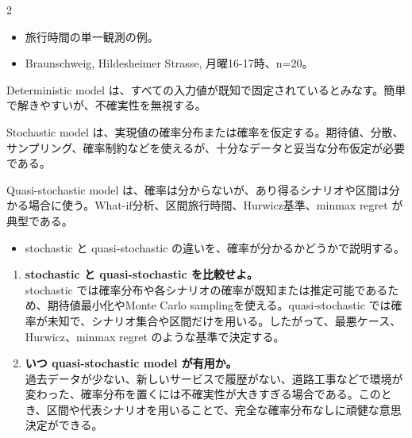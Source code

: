 \clearpage
{}
\begin{multicols}{2}\footnotesize\raggedcolumns
{}
\begin{itemize}
\item 旅行時間の単一観測の例。
\item Braunschweig, Hildesheimer Strasse, 月曜16-17時、n=20。
\end{itemize}
Deterministic model は、すべての入力値が既知で固定されているとみなす。簡単で解きやすいが、不確実性を無視する。\par

Stochastic model は、実現値の確率分布または確率を仮定する。期待値、分散、サンプリング、確率制約などを使えるが、十分なデータと妥当な分布仮定が必要である。\par

Quasi-stochastic model は、確率は分からないが、あり得るシナリオや区間は分かる場合に使う。What-if分析、区間旅行時間、Hurwicz基準、minmax regret が典型である。\par
{}
\begin{itemize}
\item stochastic と quasi-stochastic の違いを、確率が分かるかどうかで説明する。
\end{itemize}
\begin{enumerate}
\item \textbf{stochastic と quasi-stochastic を比較せよ。}\\stochastic では確率分布や各シナリオの確率が既知または推定可能であるため、期待値最小化やMonte Carlo samplingを使える。quasi-stochastic では確率が未知で、シナリオ集合や区間だけを用いる。したがって、最悪ケース、Hurwicz、minmax regret のような基準で決定する。
\item \textbf{いつ quasi-stochastic model が有用か。}\\過去データが少ない、新しいサービスで履歴がない、道路工事などで環境が変わった、確率分布を置くには不確実性が大きすぎる場合である。このとき、区間や代表シナリオを用いることで、完全な確率分布なしに頑健な意思決定ができる。
\end{enumerate}
\end{multicols}


